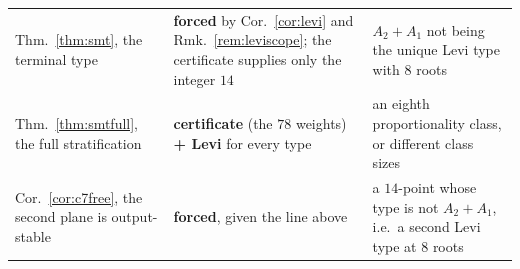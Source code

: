 \documentclass[11pt,reqno]{amsart}
\theoremstyle{plain}
\theoremstyle{definition}
\theoremstyle{remark}
\begin{document}
\begin{table}[htbp]
\begin{tabular}{@{}p{}p{}p{}@{}}
Thm.~\ref{thm:smt}, the terminal type
 & \textbf{forced} by Cor.~\ref{cor:levi} and Rmk.~\ref{rem:leviscope}; the
   certificate supplies only the integer $14$
 & $A_2{+}A_1$ not being the unique Levi type with $8$ roots\\
Thm.~\ref{thm:smtfull}, the full stratification
 & \textbf{certificate} (the $78$ weights) \textbf{+ Levi} for every type
 & an eighth proportionality class, or different class sizes\\
Cor.~\ref{cor:c7free}, the second plane is output-stable
 & \textbf{forced}, given the line above
 & a $14$-point whose type is not $A_2{+}A_1$, i.e.\ a second Levi type at $8$ roots\\

\bottomrule
\end{tabular}
\end{table}
\end{document}
